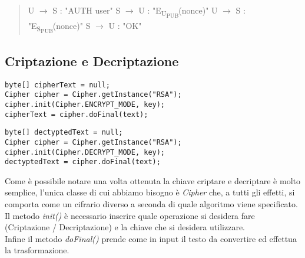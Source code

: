 \documentclass[12pt]{report}
\begin{document}
\begin{quote}
U $\rightarrow$ S : "AUTH user"\newline
S $\rightarrow$ U : "E\textsubscript{U\textsubscript{PUB}}(nonce)"\newline
U $\rightarrow$ S : "E\textsubscript{S\textsubscript{PUB}}(nonce)"\newline
S $\rightarrow$ U : "OK"\newline
\end{quote}

\subsection*{Criptazione e Decriptazione}

\begin{lstlisting}
byte[] cipherText = null;
Cipher cipher = Cipher.getInstance("RSA");
cipher.init(Cipher.ENCRYPT_MODE, key);
cipherText = cipher.doFinal(text);
\end{lstlisting}

\begin{lstlisting}
byte[] dectyptedText = null;
Cipher cipher = Cipher.getInstance("RSA");
cipher.init(Cipher.DECRYPT_MODE, key);
dectyptedText = cipher.doFinal(text);
\end{lstlisting}
\newpage

Come è possibile notare una volta ottenuta la chiave criptare e decriptare è molto semplice, l'unica classe di cui abbiamo bisogno è \textit{Cipher} che, a tutti gli effetti, si comporta come un cifrario diverso a seconda di quale algoritmo viene specificato.\\
Il metodo \textit{init()} è necessario inserire quale operazione si desidera fare (Criptazione / Decriptazione) e la chiave che si desidera utilizzare.\\
Infine il metodo \textit{doFinal()} prende come in input il testo da convertire ed effettua la trasformazione.
\end{document}
